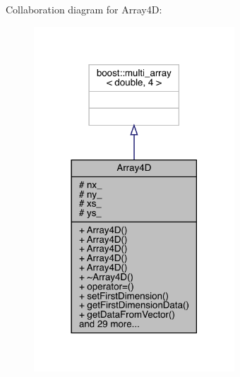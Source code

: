 Collaboration diagram for Array4D\+:
\nopagebreak
\begin{figure}[H]
\begin{center}
\leavevmode
\includegraphics[width=213pt]{class_array4_d__coll__graph}
\end{center}
\end{figure}
